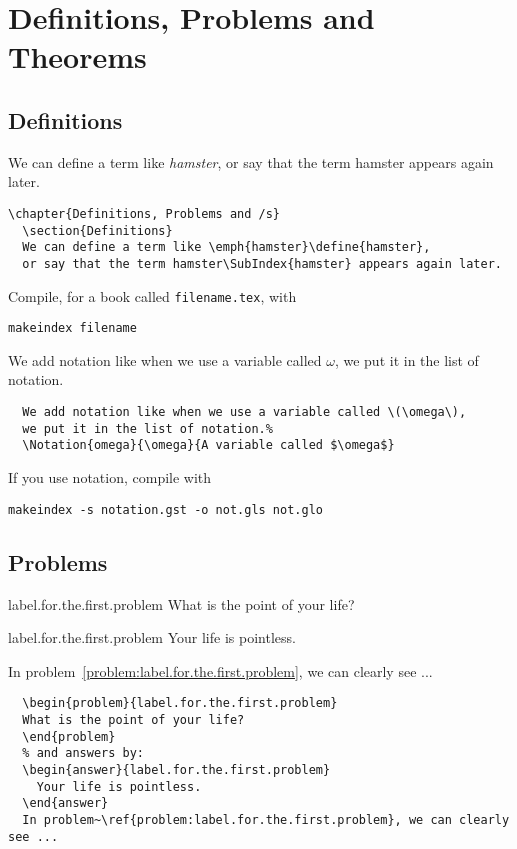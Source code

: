 \chapter{Definitions, Problems and Theorems}
\section{Definitions}
We can define a term like \emph{hamster}, or say that the term hamster appears again later.
\begin{Verbatim}[frame=leftline]
  \chapter{Definitions, Problems and /s}
  \section{Definitions}
  We can define a term like \emph{hamster}\define{hamster},
  or say that the term hamster\SubIndex{hamster} appears again later.
\end{Verbatim}
Compile, for a book called \verb!filename.tex!, with
\begin{Verbatim}[frame=leftline]
  makeindex filename
\end{Verbatim}
We add notation like when we use a variable called \(\omega\),
we put it in the list of notation.%
\begin{Verbatim}
  We add notation like when we use a variable called \(\omega\),
  we put it in the list of notation.%
  \Notation{omega}{\omega}{A variable called $\omega$}
\end{Verbatim}
If you use notation, compile with
\begin{Verbatim}[frame=leftline]
  makeindex -s notation.gst -o not.gls not.glo
\end{Verbatim}
\section{Problems}
\begin{problem}{label.for.the.first.problem}
What is the point of your life?
\end{problem}
\begin{answer}{label.for.the.first.problem}
  Your life is pointless.
\end{answer}
In problem~\ref{problem:label.for.the.first.problem}, we can clearly see ...
\begin{Verbatim}[frame=leftline]
  % We add problems by:
  \begin{problem}{label.for.the.first.problem}
  What is the point of your life?
  \end{problem}
  % and answers by:
  \begin{answer}{label.for.the.first.problem}
    Your life is pointless.
  \end{answer}
  In problem~\ref{problem:label.for.the.first.problem}, we can clearly see ...
\end{Verbatim}
